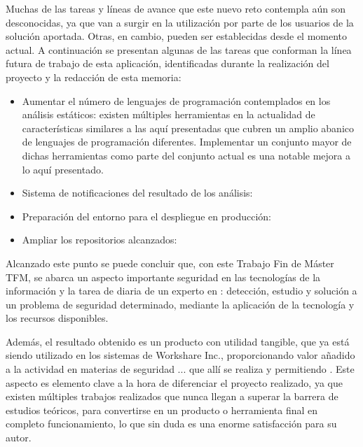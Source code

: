 Muchas de las tareas y líneas de avance que este nuevo reto contempla aún son desconocidas, ya que van a surgir en la utilización por parte de los usuarios de la solución aportada. Otras, en cambio, pueden ser establecidas desde el momento actual. A continuación se presentan algunas de las tareas que conforman la línea futura de trabajo de esta aplicación, identificadas durante la realización del proyecto y la redacción de esta memoria:

\begin{itemize}
	\item Aumentar el número de lenguajes de programación contemplados en los análisis estáticos: existen múltiples herramientas en la actualidad de características similares a las aquí presentadas que cubren un amplio abanico de lenguajes de programación diferentes. Implementar un conjunto mayor de dichas herramientas como parte del conjunto actual es una notable mejora a lo aquí presentado.
	\item Sistema de notificaciones del resultado de los análisis:
	\item Preparación del entorno para el despliegue en producción:
	\item Ampliar los repositorios alcanzados:
\end{itemize}

Alcanzado este punto se puede concluir que, con este Trabajo Fin de Máster \gls{TFM}, se abarca un aspecto importante  seguridad en las tecnologías de la información y la tarea de diaria de un experto en : detección, estudio y solución a un problema de seguridad determinado, mediante la aplicación de la tecnología y los recursos disponibles.

Además, el resultado obtenido es un producto con utilidad tangible, que ya está siendo utilizado en los sistemas de Workshare Inc., proporcionando valor añadido a la actividad en materias de seguridad ... que allí se realiza y permitiendo . Este aspecto es elemento clave a la hora de diferenciar el proyecto realizado, ya que existen múltiples trabajos realizados que nunca llegan a superar la barrera de estudios teóricos, para convertirse en un producto o herramienta final en completo funcionamiento, lo que sin duda es una enorme satisfacción para su autor.

\endinput
